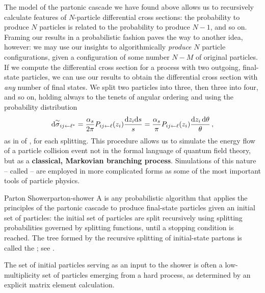 The model of the partonic cascade we have found above allows us to recursively calculate features of \(N\)-particle differential cross sections:
%
the probability to produce \(N\) particles is related to the probability to produce \(N-1\), and so on.
%
Framing our results in a probabilistic fashion paves the way to another idea, however:
%
we may use our insights to algorithmically \textit{produce} \(N\) particle configurations, given a configuration of some number \(N-M\) of original particles.
%
If we compute the differential cross section for a process with two outgoing, final-state particles, we can use our results to obtain the differential cross section with \textit{any} number of final states.
%
We split two particles into three, then three into four, and so on, holding always to the tenets of angular ordering and using the probability distribution
\begin{align}
    \label{eq:splitting-prob-ch3}
    \dsigmatilde_{ij \leftarrow \ell^*}
    =
    \frac{\alpha_s}{2\pi}
    P_{ij \leftarrow \ell}(z_i) \frac{\dd z_i \dd s}{s}
    =
    \frac{\alpha_s}{\pi}
    P_{ij \leftarrow \ell}(z_i) \frac{\dd z_i \, \dd \theta}{\theta}
    \,,
\end{align}
as in  of , for each splitting.
%
This procedure allows us to simulate the energy flow of a particle collision event not in the formal language of quantum field theory, but as a \textbf{classical, Markovian branching process}.
%
Simulations of this nature -- called  -- are employed in more complicated forms as some of the most important tools of particle physics.


\begin{definitionbox}{Parton Shower}{parton-shower}
    A  is any probabilistic algorithm that applies the principles of the partonic cascade to produce final-state particles given an initial set of particles:
    the initial set of particles are split recursively using splitting probabilities governed by splitting functions, until a stopping condition is reached.
    The tree formed by the recursive splitting of initial-state partons is called the ;
    see .

    The set of initial particles serving as an input to the shower is often a low-multiplicity set of particles emerging from a hard process, as determined by an explicit matrix element calculation.
\end{definitionbox}


